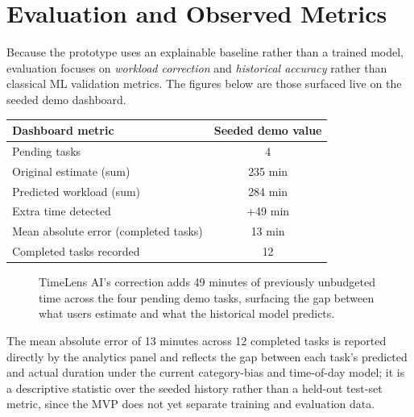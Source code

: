 \documentclass[11pt,a4paper]{article}
\begin{document}
\section{Evaluation and Observed Metrics}
Because the prototype uses an explainable baseline rather than a trained model, evaluation focuses on
\emph{workload correction} and \emph{historical accuracy} rather than classical ML validation metrics.
The figures below are those surfaced live on the seeded demo dashboard.

\begin{center}
\begin{tabular}{lc}
\toprule
\textbf{Dashboard metric} & \textbf{Seeded demo value} \\
\midrule
Pending tasks & 4 \\
Original estimate (sum) & 235 min \\
Predicted workload (sum) & 284 min \\
Extra time detected & +49 min \\
Mean absolute error (completed tasks) & 13 min \\
Completed tasks recorded & 12 \\
\bottomrule
\end{tabular}
\end{center}

\begin{figure}[htbp]
\centering
{}
\caption{TimeLens AI's correction adds 49 minutes of previously unbudgeted time across the four
pending demo tasks, surfacing the gap between what users estimate and what the historical model
predicts.}
\label{fig:workload}
\end{figure}

The mean absolute error of 13 minutes across 12 completed tasks is reported directly by the analytics
panel and reflects the gap between each task's predicted and actual duration under the current
category-bias and time-of-day model; it is a descriptive statistic over the seeded history rather than
a held-out test-set metric, since the MVP does not yet separate training and evaluation data.
\end{document}
